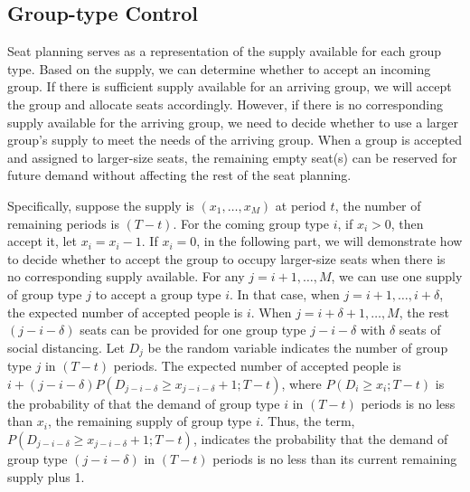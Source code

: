 

\subsection{Group-type Control}\label{nested_policy}
Seat planning serves as a representation of the supply available for each group type. Based on the supply, we can determine whether to accept an incoming group. If there is sufficient supply available for an arriving group, we will accept the group and allocate seats accordingly. However, if there is no corresponding supply available for the arriving group, we need to decide whether to use a larger group's supply to meet the needs of the arriving group. When a group is accepted and assigned to larger-size seats, the remaining empty seat(s) can be reserved for future demand without affecting the rest of the seat planning.

Specifically, suppose the supply is $(x_1, \ldots, x_M)$ at period $t$, the number of remaining periods is $(T-t)$. For the coming group type $i$, if $x_i > 0$, then accept it, let $x_i = x_i -1$.
If $x_i = 0$, in the following part, we will demonstrate how to decide whether to accept the group to occupy larger-size seats when there is no corresponding supply available. For any $j=i+1, \ldots, M$, we can use one supply of group type $j$ to accept a group type $i$. In that case, when $j = i+1, \ldots, i+\delta$, the expected number of accepted people is $i$. When $j = i+\delta+1, \ldots, M$, the rest $(j-i-\delta)$ seats can be provided for one group type $j-i-\delta$ with $\delta$ seats of social distancing. Let $D_j$ be the random variable indicates the number of group type $j$ in $(T-t)$ periods. The expected number of accepted people is $i + (j-i-\delta)P(D_{j-i-\delta} \geq x_{j-i-\delta}+1; T-t)$, where $P(D_i \geq x_i; T-t)$ is the probability of that the demand of group type $i$ in $(T-t)$ periods is no less than $x_i$, the remaining supply of group type $i$. Thus, the term, $P(D_{j-i-\delta} \geq x_{j-i-\delta}+1; T-t)$, indicates the probability that the demand of group type $(j-i-\delta)$ in $(T-t)$ periods is no less than its current remaining supply plus 1. 

